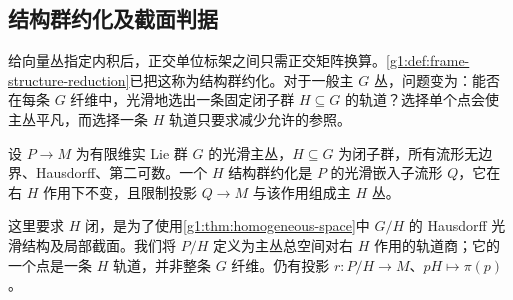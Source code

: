 \subsection{结构群约化及截面判据}
\label{g1:subsec:1801:04}

给向量丛指定内积后，正交单位标架之间只需正交矩阵换算。\cref{g1:def:frame-structure-reduction}已把这称为结构群约化。对于一般主 \(G\) 丛，问题变为：能否在每条 \(G\) 纤维中，光滑地选出一条固定闭子群 \(H\subseteq G\) 的轨道？选择单个点会使主丛平凡，而选择一条 \(H\) 轨道只要求减少允许的参照。

\begin{definition}\label{g1:def:principal-reduction}
	设 \(P\to M\) 为有限维实 Lie 群 \(G\) 的光滑主丛，\(H\subseteq G\) 为闭子群，所有流形无边界、Hausdorff、第二可数。一个 \(H\) 结构群约化是 \(P\) 的光滑嵌入子流形 \(Q\)，它在右 \(H\) 作用下不变，且限制投影 \(Q\to M\) 与该作用组成主 \(H\) 丛。
\end{definition}

这里要求 \(H\) 闭，是为了使用\cref{g1:thm:homogeneous-space}中 \(G/H\) 的 Hausdorff 光滑结构及局部截面。我们将 \(P/H\) 定义为主丛总空间对右 \(H\) 作用的轨道商；它的一个点是一条 \(H\) 轨道，并非整条 \(G\) 纤维。仍有投影 \(r:P/H\to M\)、\(pH\mapsto\pi(p)\)。

